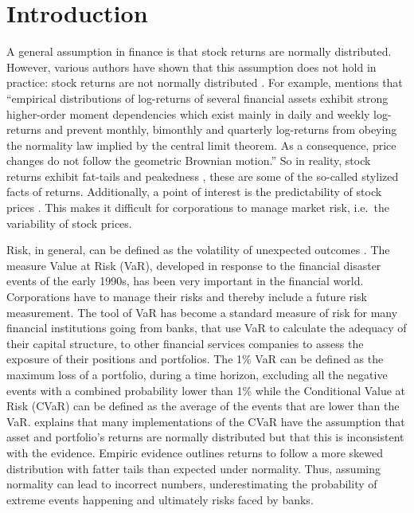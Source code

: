 \documentclass[a4paper, twoside]{templates/ociamthesis}
\begin{document}
\hypertarget{introduction}{%
\chapter*{Introduction}\label{introduction}}

\adjustmtc
{}

\noindent A general assumption in finance is that stock returns are normally distributed. However, various authors have shown that this assumption does not hold in practice: stock returns are not normally distributed \autocites[Among which][]{theodossiou2000,subbotin1923,theodossiou2015}. For example, \textcite{theodossiou2000} mentions that ``empirical distributions of log-returns of several financial assets exhibit strong higher-order moment dependencies which exist mainly in daily and weekly log-returns and prevent monthly, bimonthly and quarterly log-returns from obeying the normality law implied by the central limit theorem. As a consequence, price changes do not follow the geometric Brownian motion.'' So in reality, stock returns exhibit fat-tails and peakedness \autocite{Officer1972}, these are some of the so-called stylized facts of returns. Additionally, a point of interest is the predictability of stock prices \autocite{fama1965,Fama1970,welch2008}. This makes it difficult for corporations to manage market risk, i.e.~the variability of stock prices. ~

Risk, in general, can be defined as the volatility of unexpected outcomes \autocite{jorion2007}. The measure Value at Risk (VaR), developed in response to the financial disaster events of the early 1990s, has been very important in the financial world. Corporations have to manage their risks and thereby include a future risk measurement. The tool of VaR has become a standard measure of risk for many financial institutions going from banks, that use VaR to calculate the adequacy of their capital structure, to other financial services companies to assess the exposure of their positions and portfolios. The 1\% VaR can be defined as the maximum loss of a portfolio, during a time horizon, excluding all the negative events with a combined probability lower than 1\% while the Conditional Value at Risk (CVaR) can be defined as the average of the events that are lower than the VaR. \textcite{bali2008} explains that many implementations of the CVaR have the assumption that asset and portfolio's returns are normally distributed but that this is inconsistent with the evidence. Empiric evidence outlines returns to follow a more skewed distribution with fatter tails than expected under normality. Thus, assuming normality can lead to incorrect numbers, underestimating the probability of extreme events happening and ultimately risks faced by banks.
\end{document}
